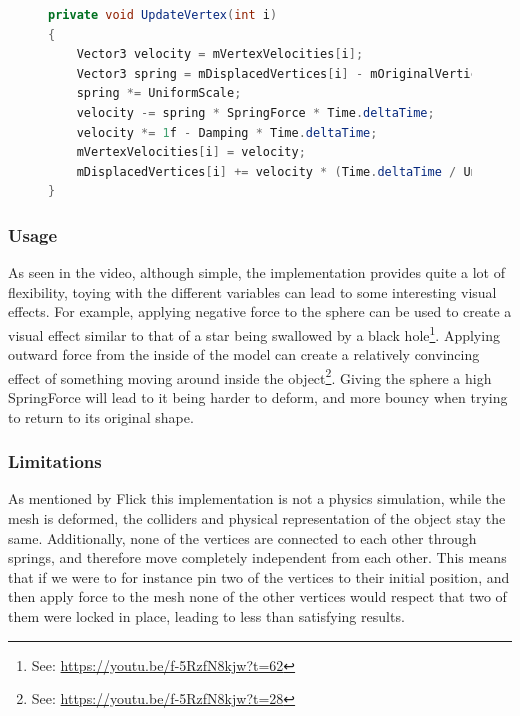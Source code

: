 \begin{figure}
\begin{lstlisting}[label={code:catlike_mesh_deformation_update},language=csharp,caption={Catlike coding mesh deformation vertex update}]
private void UpdateVertex(int i)
{
    Vector3 velocity = mVertexVelocities[i];
    Vector3 spring = mDisplacedVertices[i] - mOriginalVertices[i];
    spring *= UniformScale;
    velocity -= spring * SpringForce * Time.deltaTime;
    velocity *= 1f - Damping * Time.deltaTime;
    mVertexVelocities[i] = velocity;
    mDisplacedVertices[i] += velocity * (Time.deltaTime / UniformScale);
}
\end{lstlisting}
\end{figure}

\subsubsection{Usage}
As seen in the video, although simple, the implementation provides quite a lot of flexibility, toying with the different variables
can lead to some interesting visual effects.
For example, applying negative force to the sphere can be used to create a visual effect similar to that of a star being swallowed by a black hole\footnote{See: \url{https://youtu.be/f-5RzfN8kjw?t=62}}.
Applying outward force from the inside of the model can create a relatively convincing effect of something moving around inside the object\footnote{See: \url{https://youtu.be/f-5RzfN8kjw?t=28}}.
Giving the sphere a high SpringForce will lead to it being harder to deform, and more bouncy when trying to return to its original shape.

\subsubsection{Limitations}
As mentioned by Flick\cite{catlike_mesh_deformation} this implementation is not a physics simulation, while the mesh is deformed,
the colliders and physical representation of the object stay the same.
Additionally, none of the vertices are connected to each other through springs, and therefore move completely independent from each other.
This means that if we were to for instance pin two of the vertices to their initial position, and then apply force to the mesh
none of the other vertices would respect that two of them were locked in place, leading to less than satisfying results.

